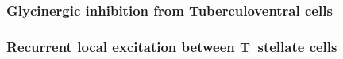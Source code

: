 \subsubsection{Glycinergic inhibition from Tuberculoventral cells}



\subsubsection{Recurrent local excitation between T~stellate cells}
